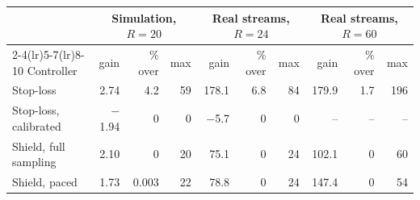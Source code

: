 \begin{tabular}{@{}l r r r r r r r r r @{}}
\toprule
 & \multicolumn{3}{c}{Simulation, $R=20$} & \multicolumn{3}{c}{Real streams, $R=24$} & \multicolumn{3}{c}{Real streams, $R=60$} \\
\cmidrule(lr){2-4}\cmidrule(lr){5-7}\cmidrule(lr){8-10}
Controller & gain & \% over & max & gain & \% over & max & gain & \% over & max \\
\midrule
Stop-loss & 2.74 & 4.2 & 59 & 178.1 & 6.8 & 84 & 179.9 & 1.7 & 196 \\
Stop-loss, calibrated & $-$1.94 & 0 & 0 & $-$5.7 & 0 & 0 & -- & -- & -- \\
Shield, full sampling & 2.10 & 0 & 20 & 75.1 & 0 & 24 & 102.1 & 0 & 60 \\
Shield, paced & 1.73 & 0.003 & 22 & 78.8 & 0 & 24 & 147.4 & 0 & 54 \\
\bottomrule
\end{tabular}
